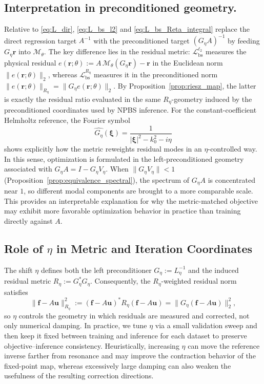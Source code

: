 \documentclass{article}
\theoremstyle{plain}
\theoremstyle{remark}
\begin{document}
\subsection{Interpretation in preconditioned geometry.}
\label{app:iterp_precond_geometry}
Relative to \eqref{eq:L_dir}, \eqref{eq:L_bs_l2} and \eqref{eq:L_bs_Reta_integral} replace the direct regression target $A^{-1}$ with the preconditioned target $(G_\eta A)^{-1}$ by feeding $G_\eta \bm r$ into $\mathcal{M}_\theta$. The key difference lies in the residual metric: $\mathcal{L}_{\mathrm{bs}}^{\ell_2}$ measures the physical residual $e(\bm r;\theta):=A\,\mathcal{M}_\theta(G_\eta \bm r)-\bm r$ in the Euclidean norm $\|e(\bm r;\theta)\|_2$, whereas $\mathcal{L}_{\mathrm{bs}}^{R_\eta}$ measures it in the preconditioned norm $\|e(\bm r;\theta)\|_{R_\eta}=\|G_\eta e(\bm r;\theta)\|_2$. By Proposition~\ref{prop:riesz_map}, the latter is exactly the residual ratio evaluated in the same $R_\eta$-geometry induced by the preconditioned coordinates used by NPBS inference. For the constant-coefficient Helmholtz reference, the Fourier symbol
\begin{equation}
\widehat{G_\eta}(\bm \xi)=\frac{1}{|\bm \xi|^2-k_0^2-i\eta}
\end{equation}
shows explicitly how the metric reweights residual modes in an $\eta$-controlled way. In this sense, optimization is formulated in the left-preconditioned geometry associated with $G_\eta A=I-G_\eta V_\eta$. When $\|G_\eta V_\eta\|<1$ (Proposition~\ref{prop:equivalence_spectral}), the spectrum of $G_\eta A$ is concentrated near $1$, so different modal components are brought to a more comparable scale. This provides an interpretable explanation for why the metric-matched objective may exhibit more favorable optimization behavior in practice than training directly against $A$.

\subsection{Role of \texorpdfstring{$\eta$}{eta} in Metric and Iteration Coordinates}
\label{app:role_eta}

The shift $\eta$ defines both the left preconditioner $G_\eta:=L_\eta^{-1}$ and the induced residual metric
$R_\eta:=G_\eta^\ast G_\eta$.
Consequently, the $R_\eta$-weighted residual norm satisfies
\begin{equation}
\|\bm f-A\bm u\|_{R_\eta}^2 := (\bm f-A\bm u)^\ast R_\eta (\bm f-A\bm u)=\|G_\eta(\bm f-A\bm u)\|_2^2,
\end{equation}
so $\eta$ controls the geometry in which residuals are measured and corrected, not only numerical damping.
In practice, we tune $\eta$ via a small validation sweep and then keep it fixed between training and inference
for each dataset to preserve objective--inference consistency.
Heuristically, increasing $\eta$ can move the reference inverse farther from resonance and may improve the contraction behavior of the fixed-point map, whereas excessively large damping can also weaken the usefulness of the resulting correction directions.
\end{document}
